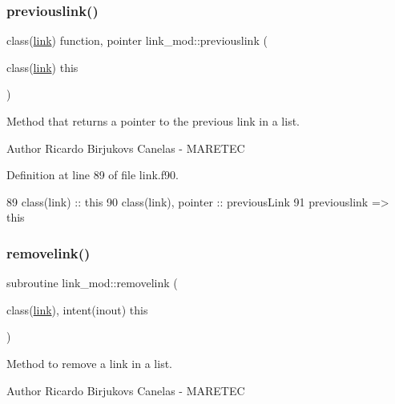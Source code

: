 \subsubsection{\texorpdfstring{previouslink()}{previouslink()}}
{\footnotesize\ttfamily class(\mbox{\hyperlink{structlink__mod_1_1link}{link}}) function, pointer link\+\_\+mod\+::previouslink (\begin{DoxyParamCaption}\item[{class(\mbox{\hyperlink{structlink__mod_1_1link}{link}})}]{this }\end{DoxyParamCaption})\hspace{0.3cm}{\ttfamily [private]}}



Method that returns a pointer to the previous link in a list. 

\begin{DoxyAuthor}{Author}
Ricardo Birjukovs Canelas -\/ M\+A\+R\+E\+T\+EC 
\end{DoxyAuthor}


Definition at line 89 of file link.\+f90.


\begin{DoxyCode}
89     \textcolor{keywordtype}{class}(link) :: this
90     \textcolor{keywordtype}{class}(link), \textcolor{keywordtype}{pointer} :: previousLink
91     previouslink => this%
\end{DoxyCode}
\mbox{\label{namespacelink__mod_ae2d89f23eb8cf4b8065b8a39e9902a22}} 
\subsubsection{\texorpdfstring{removelink()}{removelink()}}
{\footnotesize\ttfamily subroutine link\+\_\+mod\+::removelink (\begin{DoxyParamCaption}\item[{class(\mbox{\hyperlink{structlink__mod_1_1link}{link}}), intent(inout)}]{this }\end{DoxyParamCaption})\hspace{0.3cm}{\ttfamily [private]}}



Method to remove a link in a list. 

\begin{DoxyAuthor}{Author}
Ricardo Birjukovs Canelas -\/ M\+A\+R\+E\+T\+EC 
\end{DoxyAuthor}


